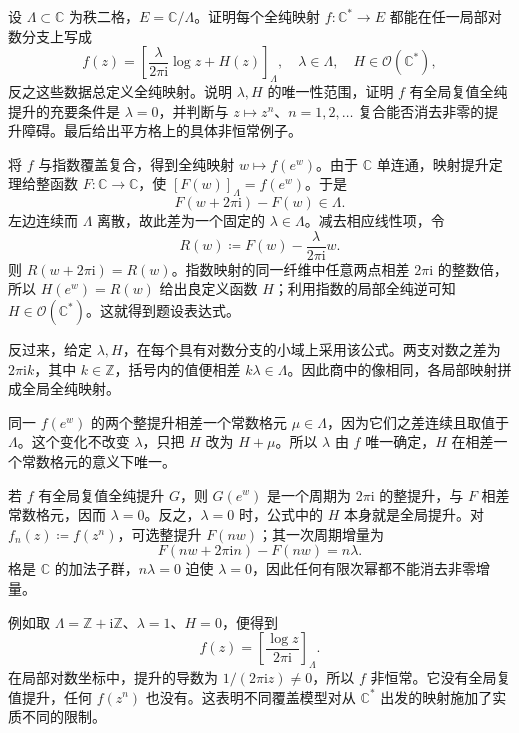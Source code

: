 \begin{exercise}[去心平面到环面的映射与提升障碍]\label{b3:ex:12-6}
设 \(\Lambda\subset\mathbb C\) 为秩二格，\(E=\mathbb C/\Lambda\)。证明每个全纯映射 \(f:\mathbb C^*\rightarrow E\) 都能在任一局部对数分支上写成
\[
 f(z)=\left[\frac{\lambda}{2\pi\mathrm i}\log z+H(z)\right]_\Lambda,
 \quad\lambda\in\Lambda,\quad H\in\mathcal O(\mathbb C^*),
\]
反之这些数据总定义全纯映射。说明 \(\lambda,H\) 的唯一性范围，证明 \(f\) 有全局复值全纯提升的充要条件是 \(\lambda=0\)，并判断与 \(z\mapsto z^n\)、\(n=1,2,\ldots\) 复合能否消去非零的提升障碍。最后给出平方格上的具体非恒常例子。
\end{exercise}
\begin{solution}
将 \(f\) 与指数覆盖复合，得到全纯映射 \(w\mapsto f(e^w)\)。由于 \(\mathbb C\) 单连通，映射提升定理给整函数 \(F:\mathbb C\rightarrow\mathbb C\)，使 \([F(w)]_\Lambda=f(e^w)\)。于是
\[
 F(w+2\pi\mathrm i)-F(w)\in\Lambda.
\]
左边连续而 \(\Lambda\) 离散，故此差为一个固定的 \(\lambda\in\Lambda\)。减去相应线性项，令
\[
 R(w)\coloneqq F(w)-\frac{\lambda}{2\pi\mathrm i}w.
\]
则 \(R(w+2\pi\mathrm i)=R(w)\)。指数映射的同一纤维中任意两点相差 \(2\pi\mathrm i\) 的整数倍，所以 \(H(e^w)=R(w)\) 给出良定义函数 \(H\)；利用指数的局部全纯逆可知 \(H\in\mathcal O(\mathbb C^*)\)。这就得到题设表达式。

反过来，给定 \(\lambda,H\)，在每个具有对数分支的小域上采用该公式。两支对数之差为 \(2\pi\mathrm i k\)，其中 \(k\in\mathbb Z\)，括号内的值便相差 \(k\lambda\in\Lambda\)。因此商中的像相同，各局部映射拼成全局全纯映射。

同一 \(f(e^w)\) 的两个整提升相差一个常数格元 \(\mu\in\Lambda\)，因为它们之差连续且取值于 \(\Lambda\)。这个变化不改变 \(\lambda\)，只把 \(H\) 改为 \(H+\mu\)。所以 \(\lambda\) 由 \(f\) 唯一确定，\(H\) 在相差一个常数格元的意义下唯一。

若 \(f\) 有全局复值全纯提升 \(G\)，则 \(G(e^w)\) 是一个周期为 \(2\pi\mathrm i\) 的整提升，与 \(F\) 相差常数格元，因而 \(\lambda=0\)。反之，\(\lambda=0\) 时，公式中的 \(H\) 本身就是全局提升。对 \(f_n(z)\coloneqq f(z^n)\)，可选整提升 \(F(nw)\)；其一次周期增量为
\[
 F(nw+2\pi\mathrm i n)-F(nw)=n\lambda.
\]
格是 \(\mathbb C\) 的加法子群，\(n\lambda=0\) 迫使 \(\lambda=0\)，因此任何有限次幂都不能消去非零增量。

例如取 \(\Lambda=\mathbb Z+\mathrm i\mathbb Z\)、\(\lambda=1\)、\(H=0\)，便得到
\[
 f(z)=\left[\frac{\log z}{2\pi\mathrm i}\right]_\Lambda.
\]
在局部对数坐标中，提升的导数为 \(1/(2\pi\mathrm i z)\ne0\)，所以 \(f\) 非恒常。它没有全局复值提升，任何 \(f(z^n)\) 也没有。这表明不同覆盖模型对从 \(\mathbb C^*\) 出发的映射施加了实质不同的限制。
\end{solution}

